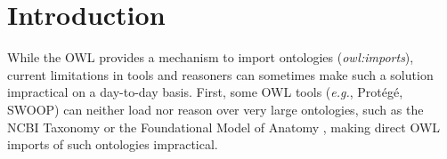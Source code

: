 \documentclass[a4paper,10pt,twocolumn]{article}
\newcommand{\protege}{Prot\'{e}g\'{e}}
\begin{document}
\section*{Introduction}
\label{intro}








While the \ac{OWL} \cite{RefWorks:1506} provides a mechanism to import ontologies (\emph{owl:imports}), current limitations in tools and reasoners can sometimes make such a solution impractical on a day-to-day basis.
First, some OWL tools (\emph{e.g.}, Prot\'eg\'e, SWOOP) can neither load nor reason over very large ontologies, such as the NCBI Taxonomy \cite{RefWorks:1502} or the Foundational Model of Anatomy \cite{RefWorks:1558}, making direct \ac{OWL} imports of such ontologies impractical. 
\end{document}
